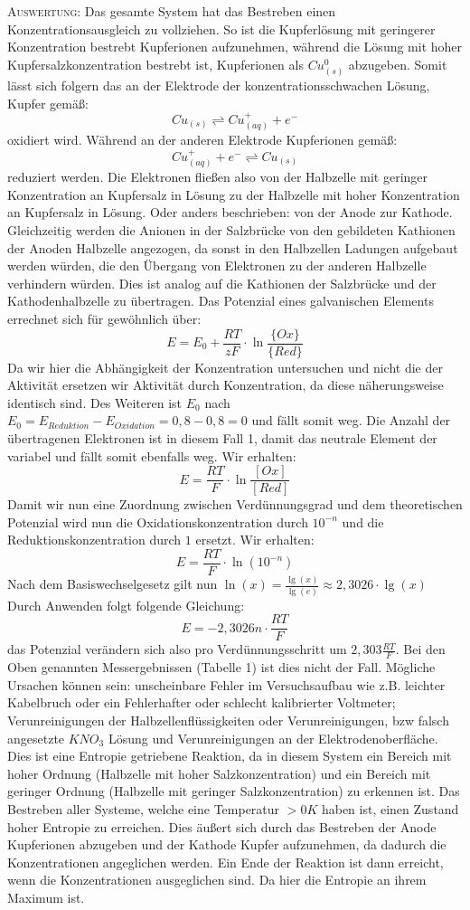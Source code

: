 \documentclass[11pt, a4paper]{article}
\begin{document}
\textsc{Auswertung:}\hspace{8mm} Das gesamte System hat das Bestreben einen Konzentrationsausgleich zu vollziehen. So ist die Kupferlösung mit geringerer Konzentration bestrebt Kupferionen aufzunehmen, während die Lösung mit hoher Kupfersalzkonzentration bestrebt ist, Kupferionen als $Cu^0_{(s)}$ abzugeben. Somit lässt sich folgern das an der Elektrode der konzentrationsschwachen Lösung, Kupfer gemäß: $$Cu_{(s)}\rightleftharpoons Cu^+_{(aq)} + e^-$$ oxidiert wird. Während an der anderen Elektrode Kupferionen gemäß: $$Cu^+_{(aq)} + e^- \rightleftharpoons Cu_{(s)}$$ reduziert werden. Die Elektronen fließen also von der Halbzelle mit geringer Konzentration an Kupfersalz in Lösung zu der Halbzelle mit hoher Konzentration an Kupfersalz in Lösung. Oder anders beschrieben: von der Anode zur Kathode. Gleichzeitig werden die Anionen in der Salzbrücke von den gebildeten Kathionen der Anoden Halbzelle angezogen, da sonst in den Halbzellen Ladungen aufgebaut werden würden, die den Übergang von Elektronen zu der anderen Halbzelle verhindern würden. Dies ist analog auf die Kathionen der Salzbrücke und der Kathodenhalbzelle zu übertragen. Das Potenzial eines galvanischen Elements errechnet sich für gewöhnlich über: $$E=E_0+\frac{RT}{zF}\cdot \ln\frac{\{Ox\}}{\{Red\}}$$ Da wir hier die Abhängigkeit der Konzentration untersuchen und nicht die der Aktivität ersetzen wir Aktivität durch Konzentration, da diese näherungsweise identisch sind. Des Weiteren ist $E_0$ nach $E_0 = E_{Reduktion} - E_{Oxidation}= 0,8-0,8 = 0$ und fällt somit weg. Die Anzahl der übertragenen Elektronen ist in diesem Fall 1, damit das neutrale Element der variabel und fällt somit ebenfalls weg. Wir erhalten: $$E=\frac{RT}{F}\cdot \ln\frac{[Ox]}{[Red]}$$ Damit wir nun eine Zuordnung zwischen Verdünnungsgrad und dem theoretischen Potenzial wird nun die Oxidationskonzentration durch $10^{-n}$ und die Reduktionskonzentration durch $1$ ersetzt. Wir erhalten: $$E=\frac{RT}{F}\cdot \ln(10^{-n})$$ Nach dem Basiswechselgesetz gilt nun $\ln(x)=\frac{\lg(x)}{\lg(e)}\approx2,3026\cdot \lg(x)$ Durch Anwenden folgt folgende Gleichung: $$E=-2,3026n\cdot\frac{RT}{F}$$ das Potenzial verändern sich also pro Verdünnungsschritt um $2,303\frac{RT}{F}$. Bei den Oben genannten Messergebnissen (Tabelle 1) ist dies nicht der Fall. Mögliche Ursachen können sein: unscheinbare Fehler im Versuchsaufbau wie z.B. leichter Kabelbruch oder ein Fehlerhafter oder schlecht kalibrierter Voltmeter; Verunreinigungen der Halbzellenflüssigkeiten oder Verunreinigungen, bzw falsch angesetzte $KNO_3$ Lösung und Verunreinigungen an der Elektrodenoberfläche. Dies ist eine Entropie getriebene Reaktion, da in diesem System ein Bereich mit hoher Ordnung (Halbzelle mit hoher Salzkonzentration) und ein Bereich mit geringer Ordnung (Halbzelle mit geringer Salzkonzentration) zu erkennen ist. Das Bestreben aller Systeme, welche eine Temperatur $>0K$ haben ist, einen Zustand hoher Entropie zu erreichen. Dies äußert sich durch das Bestreben der Anode Kupferionen abzugeben und der Kathode Kupfer aufzunehmen, da dadurch die Konzentrationen angeglichen werden. Ein Ende der Reaktion ist dann erreicht, wenn die Konzentrationen ausgeglichen sind. Da hier die Entropie an ihrem Maximum ist. 
\end{document}
